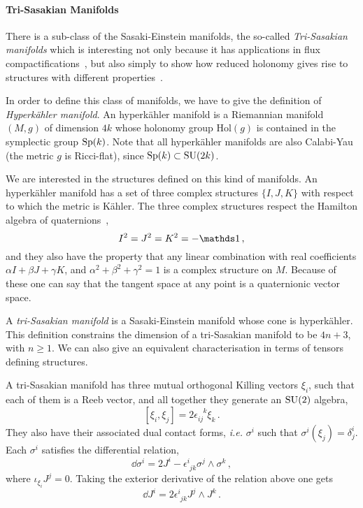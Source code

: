 \documentclass[debug]{phd}
\begin{document}
					\paragraph{Tri-Sasakian Manifolds} 
					There is a sub-class of the Sasaki-Einstein manifolds, the so-called \emph{Tri-Sasakian manifolds} which is interesting not only because it has applications in flux compactifications~\cite{DavideTriSas}, but also simply to show how reduced holonomy gives rise to structures with different properties~\cite{TriSasakiReview}.
					
					In order to define this class of manifolds, we have to give the definition of \emph{Hyperk\"ahler manifold}.
					An hyperk\"ahler manifold is a Riemannian manifold $(M,g)$ of dimension $4k$ whose holonomy group $\mathrm{Hol}(g)$ is contained in the symplectic group $\mathrm{Sp}(k)$.
					Note that all hyperk\"ahler manifolds are also Calabi-Yau (the metric $g$ is Ricci-flat), since $\mathrm{Sp}(k) \subset \mathrm{SU}(2k)$.
					
					We are interested in the structures defined on this kind of manifolds.
					An hyperk\"ahler manifold has a set of three complex structures $\{I, J, K\}$ with respect to which the metric is K\"ahler.
					The three complex structures respect the Hamilton algebra of quaternions~\cite{EncyclMath},
							\begin{equation}
								I^2 = J^2 = K^2 = - \id \, ,
							\end{equation}
					and they also have the property that any linear combination with real coefficients $\alpha I + \beta J + \gamma K$, and $\alpha^2 + \beta^2 + \gamma^2 = 1$ is a complex structure on $M$.
					Because of these one can say that the tangent space at any point is a quaternionic vector space.
					
					A \emph{tri-Sasakian manifold} is a Sasaki-Einstein manifold whose cone is hyperk\"ahler.
					This definition constrains the dimension of a tri-Sasakian manifold to be $4n+3$, with $n \geq 1$.
					We can also give an equivalent characterisation in terms of tensors defining structures.
					
					A tri-Sasakian manifold has three mutual orthogonal Killing vectors $\xi_i$, such that each of them is a Reeb vector, and all together they generate an $\mathrm{SU}(2)$ algebra,
							\begin{equation}
								\left[\xi_i , \xi_j \right] = 2 \epsilon_{ij}^{\phantom{ij}k} \xi_k \, .
							\end{equation}
					They also have their associated dual contact forms, \emph{i.e.} $\sigma^i$ such that $\sigma^i (\xi_j) = \delta^i_j$.
					Each $\sigma^i$ satisfies the differential relation,
							\begin{equation}
								\dd \sigma^i = 2 J^i - \epsilon_{\phantom{i}jk}^i \sigma^j \wedge \sigma^k \, ,
							\end{equation}
					where $\iota_{\xi_i}J^{j} = 0$.
					Taking the exterior derivative of the relation above one gets
							\begin{equation}
								\dd J^i = 2 \epsilon^{i}_{\phantom{i}jk} J^j \wedge J^k \, .
							\end{equation}
					
\end{document}
